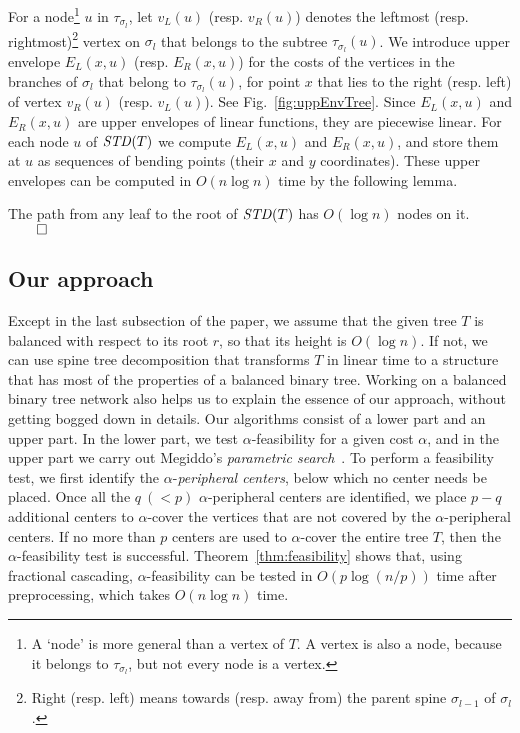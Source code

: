 \documentclass{llncs}
\newcommand{\QED}{\hfill$\qed$}
\begin{document}
{For a node\footnote{A `node' is more general than a vertex of $T$.
A vertex is also a node, because it belongs to $\tau_{\sigma_l}$,
but not every node is a vertex.}
$u$ in $\tau_{\sigma_l}$,
let $v_L(u)$ (resp. $v_R(u)$) denotes the leftmost
(resp. rightmost)\footnote{Right (resp. left) means towards (resp. away from)
the parent spine $\sigma_{l-1}$ of $\sigma_l$.}
 vertex on $\sigma_l$ that belongs to the subtree $\tau_{\sigma_l}(u)$.
We introduce upper envelope $E_L(x,u)$ (resp. $E_R(x,u)$)
for the costs
of the vertices in the branches of $\sigma_l$ that belong to $\tau_{\sigma_l}(u)$,
for point $x$ that lies to the right (resp. left) of vertex $v_R(u)$ (resp. $v_L(u)$). 
See Fig.~\ref{fig:uppEnvTree}.
Since $E_L(x,u)$ and $E_R(x,u)$ are upper envelopes of linear functions,
they are piecewise linear.
For each node $u$ of ${\it STD}(T)$ we compute $E_L(x,u)$ and $E_R(x,u)$,
and store them at $u$ as sequences of bending points
(their $x$ and $y$ coordinates).
These upper envelopes can be computed in $O(n\log n)$ time
by the following lemma.
\begin{lemma}\label{lem:std}{\rm \cite{benkoczi2004,benkoczi2003}}
The path from any leaf to the root of ${\it STD}(T)$ has $O(\log n)$ nodes on it.
\QED
\end{lemma}

\subsection{Our approach}\label{sec:approach}
Except in the last subsection of the paper,
we assume that the given tree $T$ is balanced with respect to its root $r$,
so that its height is $O(\log n)$.
If not, we can use spine tree decomposition that transforms $T$ in linear time to a structure
that has most of the properties of a balanced binary tree.
Working on a balanced binary tree network also helps us to explain the essence of our approach,
without getting bogged down in details. 
Our algorithms consist of a lower part and an upper part.
In the lower part, we test $\alpha$-feasibility for a given cost $\alpha$,
and in the upper part we carry out Megiddo's {\em parametric search}~\cite{megiddo1979}.
To perform a feasibility test,
we first identify the $\alpha$-{\em peripheral centers},
below which no center needs be placed.
Once all the $q~(< p)$ $\alpha$-peripheral centers are identified,
we place $p - q$ additional centers to $\alpha$-cover the vertices
that are not covered by the $\alpha$-peripheral centers.
If no more than $p$ centers are used to $\alpha$-cover the entire tree $T$,
then the $\alpha$-feasibility test is successful.
Theorem~\ref{thm:feasibility} shows that, using fractional cascading, $\alpha$-feasibility can be tested
in $O(p\log(n/p))$ time
after preprocessing, which takes $O(n\log n)$ time.

}
\end{document}

